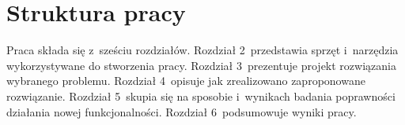 		\section{Struktura pracy}
		\label{s:struktura}
		Praca składa się z~sześciu rozdziałów. Rozdział 2~przedstawia sprzęt i~narzędzia wykorzystywane do stworzenia pracy. Rozdział 3~prezentuje projekt rozwiązania wybranego problemu. Rozdział 4~opisuje jak zrealizowano zaproponowane rozwiązanie. Rozdział 5~skupia się na sposobie i~wynikach badania poprawności działania nowej funkcjonalności. Rozdział 6~podsumowuje wyniki pracy.
